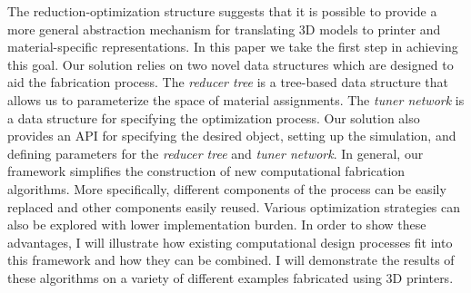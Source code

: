 The reduction-optimization structure suggests that it is possible to provide a more general abstraction mechanism for translating 3D models to printer and material-specific representations. In this paper we take the first step in achieving this goal. Our solution relies on two novel data structures which are designed to aid the fabrication process. The \emph{reducer tree} is a tree-based data structure that allows us to parameterize the space of material assignments. The \emph{tuner network} is a data structure for specifying the optimization process. Our solution also provides an API for specifying the desired object, setting up the simulation, and defining parameters for the \emph{reducer tree} and \emph{tuner network}. In general, our framework simplifies the construction of new computational fabrication algorithms. More specifically, different components of the process can be easily replaced and other components easily reused. Various optimization strategies can also be explored with lower implementation burden. In order to show these advantages, I will illustrate how existing computational design processes fit into this framework and how they can be combined. I will demonstrate the results of these algorithms on a variety of different examples fabricated using 3D printers.
